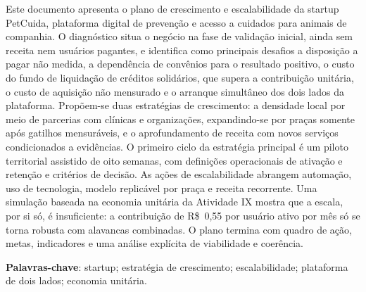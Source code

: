 \begin{resumo}[RESUMO]
\begin{SingleSpace}
\noindent Este documento apresenta o plano de crescimento e escalabilidade da startup PetCuida, plataforma digital de prevenção e acesso a cuidados para animais de companhia. O diagnóstico situa o negócio na fase de validação inicial, ainda sem receita nem usuários pagantes, e identifica como principais desafios a disposição a pagar não medida, a dependência de convênios para o resultado positivo, o custo do fundo de liquidação de créditos solidários, que supera a contribuição unitária, o custo de aquisição não mensurado e o arranque simultâneo dos dois lados da plataforma. Propõem-se duas estratégias de crescimento: a densidade local por meio de parcerias com clínicas e organizações, expandindo-se por praças somente após gatilhos mensuráveis, e o aprofundamento de receita com novos serviços condicionados a evidências. O primeiro ciclo da estratégia principal é um piloto territorial assistido de oito semanas, com definições operacionais de ativação e retenção e critérios de decisão. As ações de escalabilidade abrangem automação, uso de tecnologia, modelo replicável por praça e receita recorrente. Uma simulação baseada na economia unitária da Atividade IX mostra que a escala, por si só, é insuficiente: a contribuição de R\$~0,55 por usuário ativo por mês só se torna robusta com alavancas combinadas. O plano termina com quadro de ação, metas, indicadores e uma análise explícita de viabilidade e coerência.

\vspace{\onelineskip}
\noindent\textbf{Palavras-chave}: startup; estratégia de crescimento; escalabilidade; plataforma de dois lados; economia unitária.
\end{SingleSpace}
\end{resumo}
